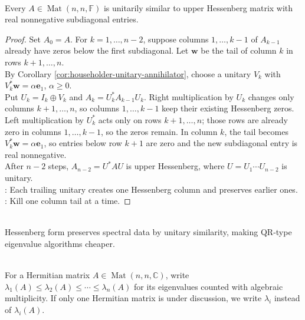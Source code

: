 \begin{theorem} \label{thm:unitary-upper-hessenberg-reduction} \\
Every $A\in\operatorname{Mat}(n,n,\mathbb{F})$ is unitarily similar to upper Hessenberg matrix with real nonnegative subdiagonal entries.
\begin{proof}
Set $A_0=A$. For $k=1,\ldots,n-2$, suppose columns $1,\ldots,k-1$ of $A_{k-1}$ already have zeros below the first subdiagonal. Let $\mathbf{w}$ be the tail of column $k$ in rows $k+1,\ldots,n$.\\
By Corollary \ref{cor:householder-unitary-annihilator}, choose a unitary $V_k$ with $V_k^*\mathbf{w}=\alpha\mathbf{e}_1$, $\alpha\geq0$.\\
Put $U_k=I_k\oplus V_k$ and $A_k=U_k^*A_{k-1}U_k$. Right multiplication by $U_k$ changes only columns $k+1,\ldots,n$, so columns $1,\ldots,k-1$ keep their existing Hessenberg zeros. Left multiplication by $U_k^*$ acts only on rows $k+1,\ldots,n$; those rows are already zero in columns $1,\ldots,k-1$, so the zeros remain. In column $k$, the tail becomes $V_k^*\mathbf{w}=\alpha\mathbf{e}_1$, so entries below row $k+1$ are zero and the new subdiagonal entry is real nonnegative.\\
After $n-2$ steps, $A_{n-2}=U^*AU$ is upper Hessenberg, where $U=U_1\cdots U_{n-2}$ is unitary.\\
: Each trailing unitary creates one Hessenberg column and preserves earlier ones.\\
: Kill one column tail at a time.
\end{proof}
\end{theorem}

\begin{perspective} \label{per:hessenberg-before-qr} \\
Hessenberg form preserves spectral data by unitary similarity, making QR-type eigenvalue algorithms cheaper.
\end{perspective}

\begin{definition} \label{def:increasing-hermitian-eigenvalue-ordering} \\
For a Hermitian matrix $A\in\operatorname{Mat}(n,n,\mathbb{C})$, write $\lambda_1(A)\leq\lambda_2(A)\leq\cdots\leq\lambda_n(A)$ for its eigenvalues counted with algebraic multiplicity. If only one Hermitian matrix is under discussion, we write $\lambda_i$ instead of $\lambda_i(A)$.
\end{definition}

